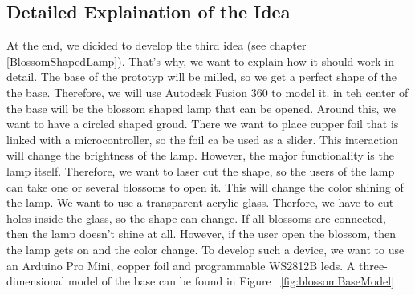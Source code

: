 \documentclass[doc.tex]{subfiles}
\begin{document}
    \subsection{Detailed Explaination of the Idea}
        \begin{flushleft}
            At the end, we dicided to develop the third idea (see chapter \ref{BlossomShapedLamp}). That's why, we want to explain 
            how it should work in detail. \newline
            The base of the prototyp will be milled, so we get a perfect shape of the the base. Therefore, we will use Autodesk Fusion 360\cite{autodeskFusion360}
            to model it. in teh center of the base will be the blossom shaped lamp that can be opened. Around this, we want to have a 
            circled shaped groud. There we want to place cupper foil that is linked with a microcontroller, %
            so the foil ca be used as a slider. This interaction will change the brightness of the lamp. \newline
            However, the major functionality is the lamp itself. Therefore, we want to laser cut the shape, so the users of the lamp can
            take one or several blossoms to open it. This will change the color shining of the lamp. We want to use a transparent acrylic glass.
            Therfore, we have to cut holes inside the glass, so the shape can change.  \newline
            If all blossoms are connected, then the lamp doesn't shine at all. However, if the user open the blossom, then the lamp gets on
            and the color change. 
            \newline
            \newline
            To develop such a device, we want to use an Arduino Pro Mini, copper foil and programmable WS2812B leds.
            A three-dimensional model of the base can be found in Figure ~\ref{fig:blossomBaseModel}
            

\end{flushleft}
\end{document}
